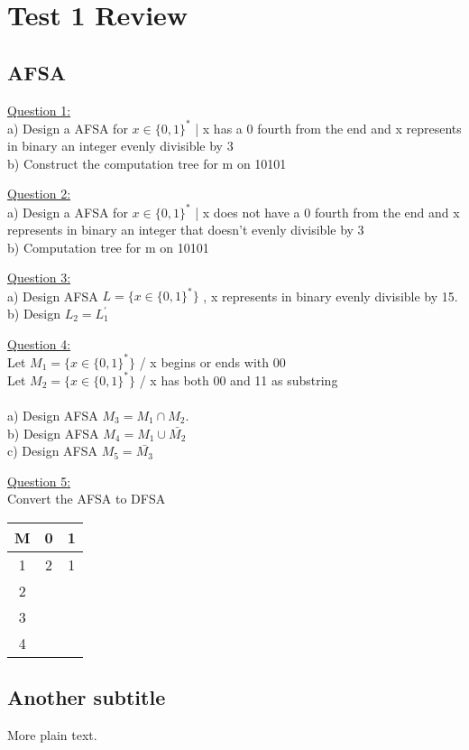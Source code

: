 \documentclass{article}
\begin{document}
\section{Test 1 Review}

\subsection{AFSA}
\underline{Question 1:}\\ a) Design a AFSA for ${ x \in
\{0,1\}^*}$ | x has a 0 fourth from the end and x represents in
binary an integer evenly divisible by 3\\
b) Construct the computation tree for m on 10101
\pagebreak

\underline {Question 2:} \\
a) Design a AFSA for ${ x \in \{0,1\}^*}$ | x does not have a 0 fourth from the
end and x represents in binary an integer that doesn't evenly divisible by 3\\
b) Computation tree for m on 10101
\pagebreak

\underline{Question 3:}\\
a) Design AFSA $L = \{ x \in \{0,1\}^*\}$ , x represents in binary evenly
divisible by 15.\\
b) Design $L_2 = L_1^'$
\pagebreak

\underline{Question 4:}\\
     Let $M_1 = \{ x \in \{ 0,1\}^*\} $ / x begins or ends with 00\\
     Let $M_2 = \{ x \in \{ 0,1\}^*\} $ / x has both 00 and 11 as substring\\
     \\
     a) Design AFSA $M_3 = M_1 \cap M_2.$\\
     b) Design AFSA $M_4 = M_1 \cup \bar {M_2}$\\
     c) Design AFSA $M_5 =\bar{M_3}$\\
\pagebreak

\underline{Question 5:}\\
 Convert the AFSA to DFSA\\
 \begin{tabular}{|c|c|c|}
\hline 
M & 0 & 1\tabularnewline
\hline 
\hline 
1 & 2\wedge3 & 1\tabularnewline
\hline 
2 &  & \tabularnewline
\hline 
3 &  & \tabularnewline
\hline 
4 &  & \tabularnewline
\hline 
\end{tabular}
 
     
\subsection{Another subtitle}

More plain text.
\end{document}
